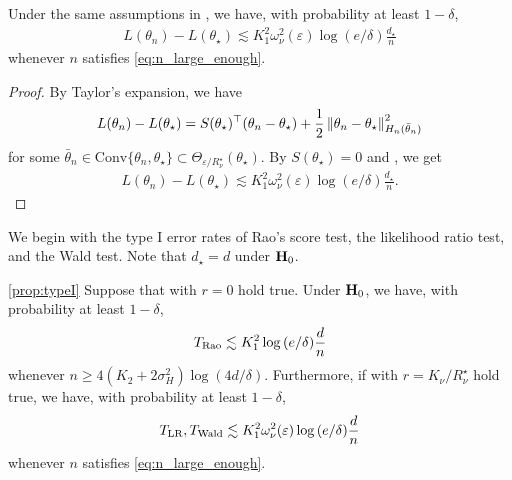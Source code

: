 \begin{corollary}\label{cor:risk_bound}
    Under the same assumptions in , we have, with probability at least $1 - \delta$,
    \begin{align*}
        L(\theta_n) - L(\theta_\star) \lesssim K_{1}^2 \omega_\nu^2(\varepsilon) \log{(e/\delta)} \frac{d_\star}{n}
    \end{align*}
    whenever $n$ satisfies \eqref{eq:n_large_enough}.
\end{corollary}
\begin{proof}
    By Taylor's expansion, we have
    \begin{align*}
        L(\theta_n) - L(\theta_\star) = S(\theta_\star)^\top (\theta_n - \theta_\star) + \frac12 \left\lVert \theta_n - \theta_\star \right\rVert_{H_n(\bar \theta_n)}^2
    \end{align*}
    for some $\bar \theta_n \in \mbox{Conv}\{\theta_n, \theta_\star\} \subset \Theta_{\varepsilon / R_\nu^\star}(\theta_\star)$.
    By $S(\theta_\star) = 0$ and , we get
    \begin{align*}
        L(\theta_n) - L(\theta_\star) \lesssim K_1^2 \omega_\nu^2(\varepsilon) \log{(e/\delta)} \frac{d_\star}{n}.
    \end{align*}
\end{proof}

We begin with the type I error rates of Rao's score test, the likelihood ratio test, and the Wald test.
Note that $d_\star = d$ under $\mathbf{H}_0$.

\begin{customprop}{\ref{prop:typeI}}
    Suppose that  with $r = 0$ hold true.
    Under $\mathbf{H}_0$, we have, with probability at least $1 - \delta$,
    \begin{align*}
        T_{\text{Rao}} \lesssim K_1^2 \log{(e/\delta)} \frac{d}n
    \end{align*}
    whenever $n \ge 4(K_2 + 2\sigma_H^2) \log{(4d/\delta)}$.
    Furthermore, if  with $r = K_\nu/R_\nu^\star$ hold true, we have, with probability at least $1 - \delta$,
    \begin{align*}
        T_{\text{LR}}, T_{\text{Wald}} \lesssim K_1^2 \omega_\nu^2(\varepsilon) \log{(e/\delta)} \frac{d}{n}
    \end{align*}
    whenever $n$ satisfies \eqref{eq:n_large_enough}.
\end{customprop}

